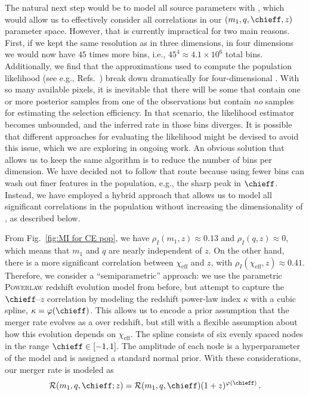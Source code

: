 \begin{refsection}
The natural next step would be to model all source parameters with \PixelPop, which would allow us to effectively consider all correlations in our $(m_1,q,\chieff,z)$ parameter space. However, that is currently impractical for two main reasons. First, if we kept the same resolution as in three dimensions, in four dimensions we would now have $45$ times more bins, i.e., $45^4 \approx 4.1 \times 10^6$ total bins. Additionally, we find that the approximations used to compute the population likelihood (see e.g., Refs.~\citep{Vitale:2020aaz,Thrane:2018qnx,Callister:2024cdx,LIGOScientific:2018jsj,LIGOScientific:2020kqk,KAGRA:2021duu,Tiwari:2017ndi,Farr_2019}) break down dramatically for four-dimensional \PixelPop. With so many available pixels, it is inevitable that there will be some that contain one or more posterior samples from one of the observations but contain \textit{no} samples for estimating the selection efficiency. In that scenario, the likelihood estimator becomes unbounded, and the inferred rate in those bins diverges. It is possible that different approaches for evaluating the likelihood might be devised to avoid this issue, which we are exploring in ongoing work. An obvious solution that allows us to keep the same algorithm is to reduce the number of bins per dimension. We have decided not to follow that route because using fewer bins can wash out finer features in the population, e.g., the sharp peak in $\chieff$. 
Instead, we have employed a hybrid approach that allows us to model all significant correlations in the population without increasing the dimensionality of \PixelPop, as described below.

From Fig.~\ref{fig:MI for CE pop}, we have $\rho_I(m_1,z) \approx 0.13$ and $\rho_I(q,z) \approx 0$, which means that $m_1$ and $q$ are nearly independent of $z$. On the other hand, there is a more significant correlation between $\chi_\mathrm{eff}$ and $z$, with $\rho_I(\chi_\mathrm{eff},z) \approx 0.41$.
Therefore, we consider a ``semiparametric'' approach: we use the parametric \textsc{Powerlaw} redshift evolution model from before, but attempt to capture the $\chieff$--$z$ correlation by modeling the redshift power-law index $\kappa$ with a cubic spline, $\kappa=\varphi(\chieff)$. This allows us to encode a prior assumption that the merger rate evolves as a \pr over redshift, but still with a flexible assumption about how this evolution depends on $\chi_\mathrm{eff}$.
The spline consists of six evenly spaced nodes in the range $\chieff \in [-1,1]$. The amplitude of each node is a hyperparameter of the model and is assigned a standard normal prior. With these considerations, our merger rate is modeled as
\begin{align}
\label{eq:(3+1)d-model}
\mathcal{R}(m_1,q,\chieff;z)
=
\mathcal{R}(m_1,q,\chieff) (1+z)^{\varphi(\chieff)}
\, .
\end{align}


\end{refsection}
